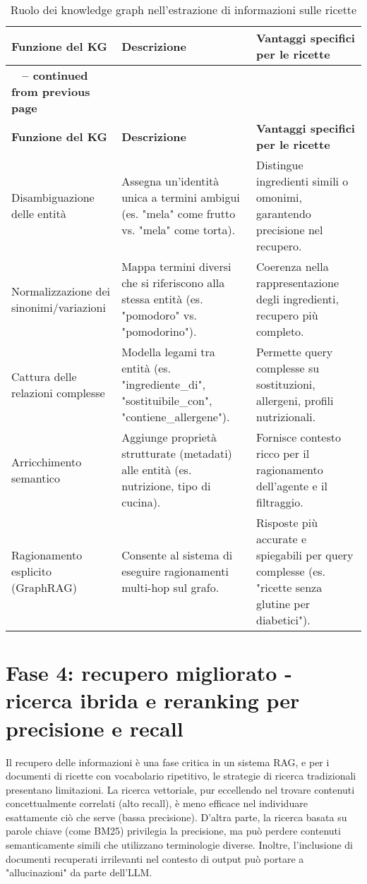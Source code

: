 \documentclass[a4paper, 11pt]{article}
\begin{document}
\begin{longtable}{>{\raggedright\arraybackslash}p{4cm} >{\raggedright\arraybackslash}p{6cm} >{\raggedright\arraybackslash}p{6cm}}
\caption{Ruolo dei knowledge graph nell'estrazione di informazioni sulle ricette}\\
\toprule
\textbf{Funzione del KG} & \textbf{Descrizione} & \textbf{Vantaggi specifici per le ricette} \\
\midrule
\endfirsthead
\multicolumn{3}{c}%
{{\bfseries \tablename\ \thetable{} -- continued from previous page}} \\
\toprule
\textbf{Funzione del KG} & \textbf{Descrizione} & \textbf{Vantaggi specifici per le ricette} \\
\midrule
\endhead
\bottomrule
\endfoot
Disambiguazione delle entità \cite{entity_linking_wiki} & Assegna un'identità unica a termini ambigui (es. "mela" come frutto vs. "mela" come torta). & Distingue ingredienti simili o omonimi, garantendo precisione nel recupero. \\
\addlinespace
Normalizzazione dei sinonimi/variazioni \cite{ingredient_substitutions_kg} & Mappa termini diversi che si riferiscono alla stessa entità (es. "pomodoro" vs. "pomodorino"). & Coerenza nella rappresentazione degli ingredienti, recupero più completo. \\
\addlinespace
Cattura delle relazioni complesse \cite{understanding_kg} & Modella legami tra entità (es. "ingrediente\_di", "sostituibile\_con", "contiene\_allergene"). & Permette query complesse su sostituzioni, allergeni, profili nutrizionali. \\
\addlinespace
Arricchimento semantico \cite{understanding_kg} & Aggiunge proprietà strutturate (metadati) alle entità (es. nutrizione, tipo di cucina). & Fornisce contesto ricco per il ragionamento dell'agente e il filtraggio. \\
\addlinespace
Ragionamento esplicito (GraphRAG) \cite{graphrag_explained} & Consente al sistema di eseguire ragionamenti multi-hop sul grafo. & Risposte più accurate e spiegabili per query complesse (es. "ricette senza glutine per diabetici"). \\
\end{longtable}

\section{Fase 4: recupero migliorato - ricerca ibrida e reranking per precisione e recall}
Il recupero delle informazioni è una fase critica in un sistema RAG, e per i documenti di ricette con vocabolario ripetitivo, le strategie di ricerca tradizionali presentano limitazioni. La ricerca vettoriale, pur eccellendo nel trovare contenuti concettualmente correlati (alto recall), è meno efficace nel individuare esattamente ciò che serve (bassa precisione). \cite{meilisearch_vector_dbs} D'altra parte, la ricerca basata su parole chiave (come BM25) privilegia la precisione, ma può perdere contenuti semanticamente simili che utilizzano terminologie diverse. \cite{hybrid_search_vectorchord} Inoltre, l'inclusione di documenti recuperati irrilevanti nel contesto di output può portare a "allucinazioni" da parte dell'LLM. \cite{mastering_rag_reranking}
\end{document}
